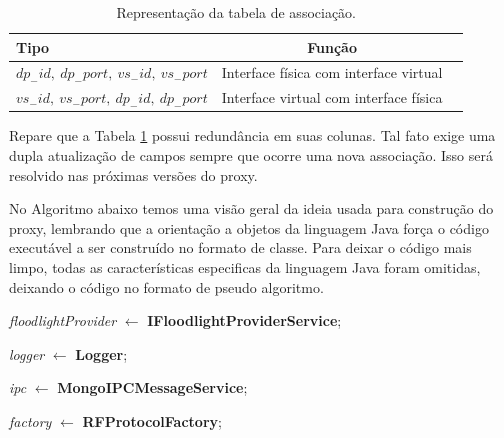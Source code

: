 \begin{itemize}
\begin{table}[h]
\centering
\begin{tabular}{|l|c|c|}
\hline
Tipo & Função\\
\hline
\hline
$dp_-id,\ dp_-port,\ vs_-id,\ vs_-port$ & Interface física com interface virtual\\
\hline
$vs_-id,\ vs_-port,\ dp_-id,\ dp_-port$ & Interface virtual com interface física\\
\hline
\end{tabular}
\caption{Representação da tabela de associação.}
\label{tab:tabela_associacao}
\end{table}

Repare que a Tabela \ref{tab:tabela_associacao} possui redundância
em suas colunas. Tal fato exige uma dupla atualização de campos
sempre que ocorre uma nova associação. Isso será resolvido
nas próximas versões do proxy.

\end{itemize} 

No Algoritmo abaixo temos uma visão geral da ideia usada para
construção do proxy, lembrando que a orientação a objetos
da linguagem Java força o código executável a ser construído
no formato de classe. Para deixar o código mais limpo, todas
as características especificas da linguagem Java foram omitidas,
deixando o código no formato de pseudo algoritmo.
\newline

\noindent
{}
\newline

\noindent
{}
\newline
\textit{floodlightProvider} $\leftarrow$ \textbf{IFloodlightProviderService};
\newline

\noindent
{}
\newline
\textit{logger} $\leftarrow$ \textbf{Logger};
\newline

\noindent
{}
\newline
\textit{ipc} $\leftarrow$ \textbf{MongoIPCMessageService};
\newline

\noindent
{}
\newline
\textit{factory} $\leftarrow$ \textbf{RFProtocolFactory};
\newline

